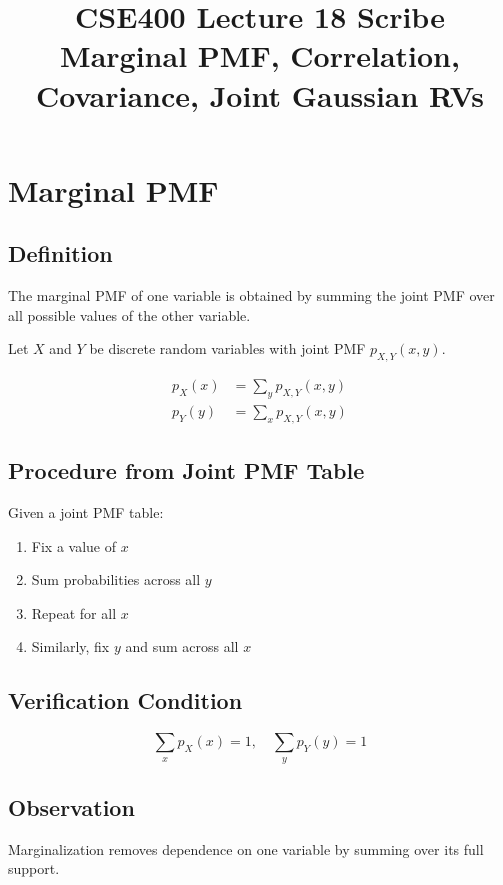 \documentclass[12pt]{article}
\title{CSE400 Lecture 18 Scribe\\
Marginal PMF, Correlation, Covariance, Joint Gaussian RVs}
\date{}
\begin{document}
\maketitle

\section{Marginal PMF}

\subsection{Definition}

The marginal PMF of one variable is obtained by summing the joint PMF over all possible values of the other variable.

Let $X$ and $Y$ be discrete random variables with joint PMF $p_{X,Y}(x,y)$.

\begin{align*}
p_X(x) &= \sum_{y} p_{X,Y}(x,y) \\
p_Y(y) &= \sum_{x} p_{X,Y}(x,y)
\end{align*}

\subsection{Procedure from Joint PMF Table}

Given a joint PMF table:

\begin{enumerate}
    \item Fix a value of $x$
    \item Sum probabilities across all $y$
    \item Repeat for all $x$
    \item Similarly, fix $y$ and sum across all $x$
\end{enumerate}

\subsection{Verification Condition}

\[
\sum_x p_X(x) = 1, \quad \sum_y p_Y(y) = 1
\]

\subsection{Observation}

Marginalization removes dependence on one variable by summing over its full support.
\end{document}
